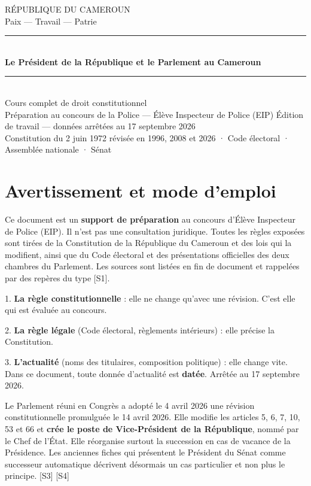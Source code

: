 \documentclass[11pt,a4paper,oneside]{report}
\newcommand{\src}[1]{\textcolor{bluec}{\scriptsize[#1]}}
\begin{document}
\begin{titlepage}\centering\vspace*{2.5cm}
{\sffamily\large\color{navy}RÉPUBLIQUE DU CAMEROUN\\[2pt]Paix — Travail — Patrie}\\[1.4cm]
{\color{gold}\rule{\textwidth}{2pt}}\\[.8cm]
{\sffamily\bfseries\color{navy}\Huge Le Président de la République et le Parlement au Cameroun}\\[.9cm]
{\color{gold}\rule{\textwidth}{2pt}}\\[1.2cm]
{\sffamily\Large Cours complet de droit constitutionnel}\\[.5cm]
{\sffamily\large Préparation au concours de la Police — Élève Inspecteur de Police (EIP)}
\vfill
{\sffamily\small Édition de travail — données arrêtées au 17 septembre 2026\\[3pt]
Constitution du 2 juin 1972 révisée en 1996, 2008 et 2026 · Code électoral · Assemblée nationale · Sénat}
\end{titlepage}
\tableofcontents
\clearpage
\chapter{Avertissement et mode d'emploi}
Ce document est un \textbf{support de préparation} au concours d'Élève Inspecteur de Police (EIP). Il n'est pas une consultation juridique. Toutes les règles exposées sont tirées de la Constitution de la République du Cameroun et des lois qui la modifient, ainsi que du Code électoral et des présentations officielles des deux chambres du Parlement. Les sources sont listées en fin de document et rappelées par des repères du type \src{S1}.

\begin{warnbox}[title={Point de vigilance — Distinguer trois choses}]
1. \textbf{La règle constitutionnelle} : elle ne change qu'avec une révision. C'est elle qui est évaluée au concours.

2. \textbf{La règle légale} (Code électoral, règlements intérieurs) : elle précise la Constitution.

3. \textbf{L'actualité} (noms des titulaires, composition politique) : elle change vite. Dans ce document, toute donnée d'actualité est \textbf{datée}. Arrêtée au 17 septembre 2026.
\end{warnbox}
\begin{warnbox}[title={Point de vigilance — Réforme à ne pas manquer : la révision constitutionnelle de 2026}]
Le Parlement réuni en Congrès a adopté le 4 avril 2026 une révision constitutionnelle promulguée le 14 avril 2026. Elle modifie les articles 5, 6, 7, 10, 53 et 66 et \textbf{crée le poste de Vice-Président de la République}, nommé par le Chef de l'État. Elle réorganise surtout la succession en cas de vacance de la Présidence. Les anciennes fiches qui présentent le Président du Sénat comme successeur automatique décrivent désormais un cas particulier et non plus le principe. \src{S3} \src{S4}
\end{warnbox}
\end{document}
